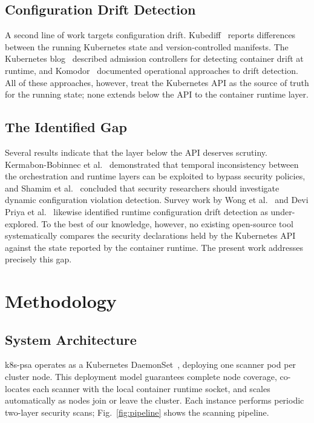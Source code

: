 \documentclass[sigconf]{acmart}
\begin{document}
\subsection{Configuration Drift Detection}

A second line of work targets configuration drift. Kubediff~\cite{kubediff2020} reports differences between the running Kubernetes state and version-controlled manifests. The Kubernetes blog~\cite{k8sdrift2021} described admission controllers for detecting container drift at runtime, and Komodor~\cite{komodor2023} documented operational approaches to drift detection. All of these approaches, however, treat the Kubernetes API as the source of truth for the running state; none extends below the API to the container runtime layer.

\subsection{The Identified Gap}

Several results indicate that the layer below the API deserves scrutiny. Kermabon-Bobinnec et al.~\cite{prospec2022} demonstrated that temporal inconsistency between the orchestration and runtime layers can be exploited to bypass security policies, and Shamim et al.~\cite{shamim2025} concluded that security researchers should investigate dynamic configuration violation detection. Survey work by Wong et al.~\cite{wong2023} and Devi Priya et al.~\cite{devipriya2023} likewise identified runtime configuration drift detection as under-explored. To the best of our knowledge, however, no existing open-source tool systematically compares the security declarations held by the Kubernetes API against the state reported by the container runtime. The present work addresses precisely this gap.

\section{Methodology}

\subsection{System Architecture}

k8s-psa operates as a Kubernetes DaemonSet~\cite{k8sdaemonset2024}, deploying one scanner pod per cluster node. This deployment model guarantees complete node coverage, co-locates each scanner with the local container runtime socket, and scales automatically as nodes join or leave the cluster. Each instance performs periodic two-layer security scans; Fig.~\ref{fig:pipeline} shows the scanning pipeline.
\end{document}
